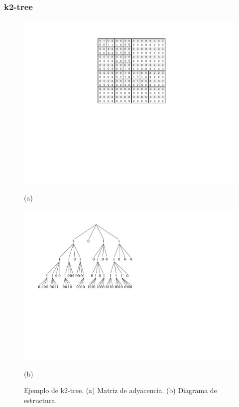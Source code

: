 \begin{frame}
\frametitle{k2-tree}

\begin{figure}%
    	\centering
    	\begin{minipage}{0.45\textwidth}
    		\centering
    		\includegraphics[scale=.5, clip,  trim=270 280 250 0]{../img/arte/k2-tree-matrix.pdf}
    		
    		(a)
    	\end{minipage}
    	\begin{minipage}{0.45\textwidth}
    		\centering
    		\includegraphics[scale=.4, clip, trim=50 280 410 0]{../img/arte/graphs-k2tree.pdf}
    		
    		(b)
    	\end{minipage}

    \caption{Ejemplo de k2-tree. (a) Matriz de adyacencia. (b) Diagrama de estructura.}
\end{figure}

\end{frame}



